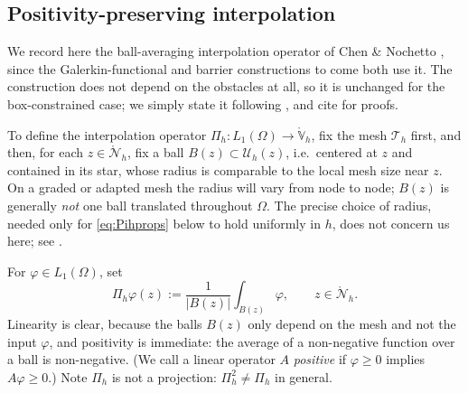 \documentclass[12pt]{amsart}
\theoremstyle{definition}
\newcommand{\Om}{\Omega}
\newcommand{\Th}{\mathcal{T}_h}
\newcommand{\Vhr}{\mathring{\mathbb{V}}_h}
\newcommand{\Nhr}{\mathring{\mathcal{N}}_h}
\newcommand{\Pih}{\Pi_h}
\newcommand{\Uh}{\mathcal{U}_h}
\begin{document}
\subsection{Positivity-preserving interpolation}

We record here the ball-averaging interpolation operator of Chen \& Nochetto \cite{ChenNochetto2000}, since the Galerkin-functional and barrier constructions to come both use it.  The construction does not depend on the obstacles at all, so it is unchanged for the box-constrained case; we simply state it following \cite[\S 2.2]{NSV03}, and cite \cite{ChenNochetto2000} for proofs.

To define the interpolation operator $\Pih : L_1(\Om) \to \Vhr$, fix the mesh $\Th$ first, and then, for each $z \in \Nhr$, fix a ball $B(z) \subset \Uh(z)$, i.e.~centered at $z$ and contained in its star, whose radius is comparable to the local mesh size near $z$.  On a graded or adapted mesh the radius will vary from node to node; $B(z)$ is generally \emph{not} one ball translated throughout $\Om$.  The precise choice of radius, needed only for \eqref{eq:Pihprops} below to hold uniformly in $h$, does not concern us here; see \cite[\S 6]{NSV03}.

For $\varphi \in L_1(\Om)$, set
\begin{equation}
\label{eq:Pih}
  \Pih\varphi(z) := \frac{1}{|B(z)|}\int_{B(z)}\varphi, \qquad z \in \Nhr.
\end{equation}
Linearity is clear, because the balls $B(z)$ only depend on the mesh and not the input $\varphi$, and positivity is immediate: the average of a non-negative function over a ball is non-negative.  (We call a linear operator $A$ \emph{positive} if $\varphi \ge 0$ implies $A\varphi \ge 0$.)  Note $\Pih$ is not a projection: $\Pih^2 \ne \Pih$ in general.
\end{document}
